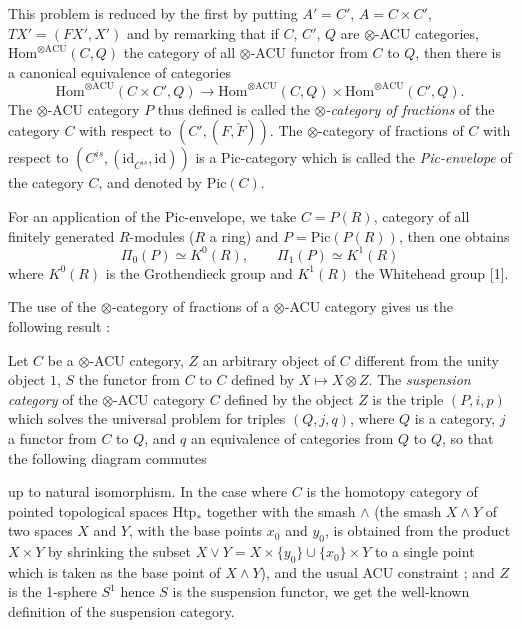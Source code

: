\documentclass[11pt,a4paper]{article}
\begin{document}
This problem is reduced by the first by putting $A' = C'$, $A = C \times
C'$, $TX' = (FX', X')$ and by remarking that if $C$, $C'$, $Q$ are
$\otimes$-ACU categories, $\mathrm{Hom}^{\otimes \mathrm{ACU}}(C, Q)$ the
category of all $\otimes$-ACU functor from $C$ to $Q$, then there is a
canonical equivalence of categories
\[
\mathrm{Hom}^{\otimes \mathrm{ACU}}(C \times C', Q) \longrightarrow
\mathrm{Hom}^{\otimes \mathrm{ACU}}(C, Q) \times
\mathrm{Hom}^{\otimes \mathrm{ACU}}(C', Q).
\]
The $\otimes$-ACU category $P$ thus defined is called the
\emph{$\otimes$-category of fractions} of the category $C$ with respect
to $(C', (F, \check{F}))$. The $\otimes$-category of fractions of $C$
with respect to $(C^{is}, (\mathrm{id}_{C^{is}}, \mathrm{id}))$ is a
Pic-category which is called the \emph{Pic-envelope} of the category $C$,
and denoted by $\mathrm{Pic}(C)$.

For an application of the Pic-envelope, we take $C = P(R)$, category of
all finitely generated $R$-modules ($R$ a ring) and $P =
\mathrm{Pic}(P(R))$, then one obtains
\[
\Pi_{0}(P) \simeq K^{0}(R), \qquad \Pi_{1}(P) \simeq K^{1}(R)
\]
where $K^{0}(R)$ is the Grothendieck group and $K^{1}(R)$ the Whitehead
group [1].

The use of the $\otimes$-category of fractions of a $\otimes$-ACU
category gives us the following result :

Let $C$ be a $\otimes$-ACU category, $Z$ an arbitrary object of $C$
different from the unity object $1$, $S$ the functor from $C$ to $C$
defined by $X \mapsto X \otimes Z$. The \emph{suspension category} of the
$\otimes$-ACU category $C$ defined by the object $Z$ is the triple $(P,
i, p)$ which solves the universal problem for triples $(Q, j, q)$, where
$Q$ is a category, $j$ a functor from $C$ to $Q$, and $q$ an equivalence
of categories from $Q$ to $Q$, so that the following diagram commutes


up to natural isomorphism. In the case where $C$ is the homotopy category
of pointed topological spaces $\mathrm{Htp}_{*}$ together with the smash
$\wedge$ (the smash $X \wedge Y$ of two spaces $X$ and $Y$, with the base
points $x_{0}$ and $y_{0}$, is obtained from the product $X \times Y$ by
shrinking the subset $X \vee Y = X \times \{y_{0}\} \cup \{x_{0}\} \times
Y$ to a single point which is taken as the base point of $X \wedge Y$),
and the usual ACU constraint ; and $Z$ is the 1-sphere $S^{1}$ hence $S$
is the suspension functor, we get the well-known definition of the
suspension category.
\end{document}
